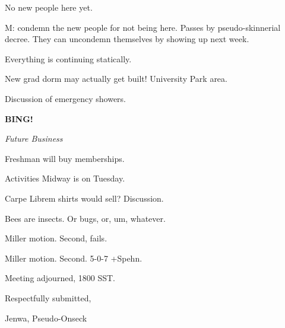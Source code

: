\documentclass[12pt]{article}
\newcommand{\bing}{{\bf BING!} }
\newcommand{\goto}[1]{\bing \vskip 12pt \centerline{{\em{#1}}}}
\begin{document}
No new people here yet.

M: condemn the new people for not being here. Passes by pseudo-skinnerial decree. They can uncondemn themselves by showing up next week.

Everything is continuing statically.

New grad dorm may actually get built! University Park area.

Discussion of emergency showers.

\goto{Future Business}

Freshman will buy memberships.

Activities Midway is on Tuesday.

Carpe Librem shirts would sell? Discussion.

Bees are insects. Or bugs, or, um, whatever.

Miller motion. Second, fails.

Miller motion. Second. 5-0-7 +Spehn.

\vspace{12pt}

\noindent
Meeting adjourned, 1800 SST.

\vspace{18pt}

\centerline{Respectfully submitted,}
\centerline{Jenwa, Pseudo-Onseck}
\end{document}
